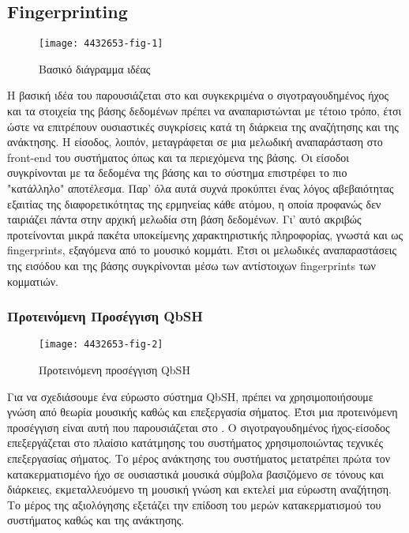 \newcommand*{\fp}{Fingerprinting}%
\newcommand*{\fps}{fingerprints}%
\subsection{\fp{}}\label{sub:fingerprinting}


\begin{wrapfigure}{r}{0.5\textwidth}
        \centering
        \vspace{-20pt}\texttt{[image: 4432653-fig-1]}
        \vspace{-20pt}\caption{Βασικό διάγραμμα ιδέας}
        \label{fig:4432653-fig-1}
\end{wrapfigure}
Η βασική ιδέα του \cite{fingerapproach2008} παρουσιάζεται στο 
και συγκεκριμένα ο σιγοτραγουδημένος ήχος και τα στοιχεία της βάσης δεδομένων
πρέπει να αναπαριστώνται με τέτοιο τρόπο, έτσι ώστε να επιτρέπουν ουσιαστικές
συγκρίσεις κατά τη διάρκεια της αναζήτησης και της ανάκτησης. Η είσοδος, λοιπόν,
μεταγράφεται σε μια μελωδική αναπαράσταση στο front-end του συστήματος όπως και
τα περιεχόμενα της βάσης. Οι είσοδοι συγκρίνονται με τα δεδομένα της βάσης και
το σύστημα επιστρέφει το πιο "κατάλληλο" αποτέλεσμα. Παρ' όλα αυτά συχνά
προκύπτει ένας λόγος αβεβαιότητας εξαιτίας της διαφορετικότητας της ερμηνείας
κάθε ατόμου, η οποία προφανώς δεν ταιριάζει πάντα στην αρχική μελωδία στη βάση
δεδομένων. Γι' αυτό ακριβώς προτείνονται μικρά πακέτα υποκείμενης χαρακτηριστικής
πληροφορίας, γνωστά και ως \fps{}, εξαγόμενα από το μουσικό κομμάτι. Έτσι οι
μελωδικές αναπαραστάσεις της εισόδου και της βάσης συγκρίνονται μέσω των
αντίστοιχων \fps{} των κομματιών.

\subsubsection{Προτεινόμενη Προσέγγιση QbSH}
\begin{wrapfigure}{r}{0.5\textwidth}
        \centering
        \vspace{-20pt}\texttt{[image: 4432653-fig-2]}
        \vspace{-20pt}\caption{Προτεινόμενη προσέγγιση QbSH}
        \label{fig:4432653-fig-2}
\end{wrapfigure}
Για να σχεδιάσουμε ένα εύρωστο σύστημα QbSH, πρέπει να χρησιμοποιήσουμε γνώση
από θεωρία μουσικής καθώς και επεξεργασία σήματος. Έτσι μια προτεινόμενη
προσέγγιση είναι αυτή που παρουσιάζεται στο . Ο
σιγοτραγουδημένος ήχος-είσοδος επεξεργάζεται στο πλαίσιο κατάτμησης του
συστήματος χρησιμοποιώντας τεχνικές επεξεργασίας σήματος. Το μέρος ανάκτησης
του συστήματος μετατρέπει πρώτα τον κατακερματισμένο ήχο σε ουσιαστικά μουσικά
σύμβολα βασιζόμενο σε τόνους και διάρκειες, εκμεταλλευόμενο τη μουσική γνώση
και εκτελεί μια εύρωστη αναζήτηση. Το μέρος της αξιολόγησης εξετάζει την
επίδοση του μερών κατακερματισμού του συστήματος καθώς και της ανάκτησης.

